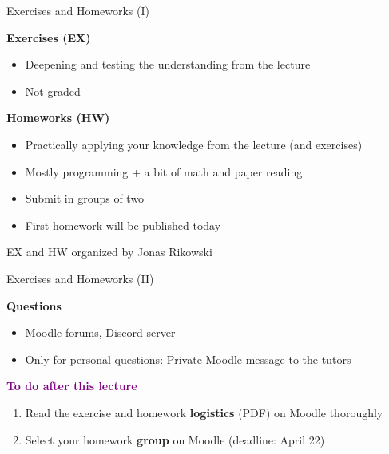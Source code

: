 \documentclass[12pt]{beamer}
\begin{document}
\begin{frame}{Exercises and Homeworks (I)}
	
	\textbf{Exercises (EX)}
	\begin{itemize}
		\item Deepening and testing the understanding from the lecture
		\item Not graded
	\end{itemize}
	
	\textbf{Homeworks (HW)}
	\begin{itemize}
		\item Practically applying your knowledge from the lecture (and exercises)
		\item Mostly programming + a bit of math and paper reading
		\item Submit in groups of two
		\item First homework will be published today
	\end{itemize}

	EX and HW organized by Jonas Rikowski
\end{frame}
\begin{frame}{Exercises and Homeworks (II)}
	
	\textbf{Questions}
	\begin{itemize}
		\item Moodle forums, Discord server
		\item Only for personal questions: Private Moodle message to the tutors
	\end{itemize}

	\colorbox{purple!10}{\textcolor{purple}{\textbf{To do after this lecture}}}
	\begin{enumerate}
		\item Read the exercise and homework \textbf{logistics} (PDF) on Moodle thoroughly
		\item Select your homework \textbf{group} on Moodle (deadline: April 22)
	\end{enumerate}

\end{frame}
\end{document}
